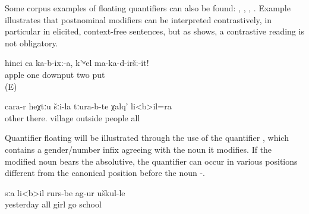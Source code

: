 Some corpus examples of floating quantifiers can also be found: , , , . Example  illustrates that postnominal modifiers can be interpreted contrastively, in particular in elicited, context-free sentences, but as  shows, a contrastive reading is not obligatory. 

\begin{exe}
		\ex	\label{ex:‎‎‎Put one apple (there), do not put two (apples)}
	\gll	hinci	ca	ka-b-ixː-a,	k'ʷel	ma-ka-d-iršː-it!\\
		apple	one	downput	two	put\\
	\glt	{} (E)
	
	\ex	\label{ex:and all the people from the other villages down there}
	\gll	cara-r	heχtːu	šːi-la	tːura-b-te	χalq'	li<b>il=ra\\
		other	there.	village	outside 	people	all\\
	\glt	{}
	
\end{exe}

Quantifier floating will be illustrated through the use of the quantifier , which contains a gender/number infix agreeing with the noun it modifies. If the modified noun bears the absolutive, the quantifier can occur in various positions different from the canonical position before the noun -. 


%
\begin{exe}
	\ex	\label{ex:Yesterday all girls went to school}
	\begin{xlist}
		\ex	\label{ex:Yesterday all girls went to school@A}
		\gll	sːa	li<b>il	rurs-be	ag-ur	uškul-le\\
			yesterday	all	girl	go	school\\
		\glt	{}

		\ex	{}	\label{ex:Yesterday all girls went to school@B}

		\ex	{}	\label{ex:Yesterday all girls went to school@C}

		\ex	{}	\label{ex:Yesterday all girls went to school@D}

	\end{xlist}
\end{exe}


